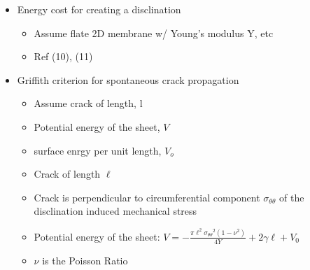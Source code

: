 \documentclass{umthesis}          %
\begin{document}
\begin{itemize}

\item Energy cost for creating a disclination\\
\label{sec-3.1.5.1}

\begin{itemize}

\item Assume flate 2D membrane w/ Young's modulus Y, etc\\
\label{sec-3.1.5.1.1}


\item Ref (10), (11)\\
\label{sec-3.1.5.1.2}

\end{itemize} %

\item Griffith criterion for spontaneous crack propagation\\
\label{sec-3.1.5.2}

\begin{itemize}

\item Assume crack of length, l\\
\label{sec-3.1.5.2.1}


\item Potential energy of the sheet, $V$\\
\label{sec-3.1.5.2.2}


\item surface enrgy per unit length, $V_o$\\
\label{sec-3.1.5.2.3}


\item Crack of length $\ell$\\
\label{sec-3.1.5.2.4}


\item Crack is perpendicular to circumferential component $\sigma_{\theta \theta}$ of the disclination induced mechanical stress\\
\label{sec-3.1.5.2.5}


\item Potential energy of the sheet: $V =-\frac{\pi \ell^2 {\sigma_{\theta \theta}}^2 (1-\nu^2)}{4 Y} + 2 \gamma \ell + V_0$\\
\label{sec-3.1.5.2.6}


\item $\nu$ is the Poisson Ratio\\
\label{sec-3.1.5.2.7}



\end{itemize}
\end{itemize}
\end{document}
